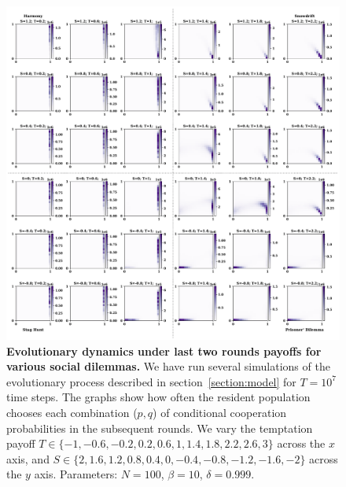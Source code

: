 \documentclass[11pt]{article}
\theoremstyle{plainCl1}
\theoremstyle{plainCl2}
\begin{document}
\begin{figure}[!htbp]
  \centering
  \includegraphics[width=\textwidth]{static/rounds_two_by_two_games.pdf}
  \caption{{\bf Evolutionary dynamics under last two rounds payoffs for various social dilemmas.} 
  We have run several simulations of the evolutionary process described in
  section~\ref{section:model} for $T\!=\!10^7$ time steps. The graphs show how
  often the resident population chooses each combination ($p,q$) of conditional
  cooperation probabilities in the subsequent rounds. We vary the temptation
  payoff \(T \in \{-1, -0.6, -0.2,  0.2, 0.6, 1, 1.4, 1.8, 2.2, 2.6, 3\}\)
  across the \(x\) axis, and  \(S \in \{2, 1.6, 1.2, 0.8, 0.4, 0, -0.4, -0.8,
  -1.2, -1.6, -2\}\) across the \(y\) axis. Parameters: $N\!=\!100$,
  $\beta\!=\!10$, $\delta\!=\!0.999$.}
  \label{fig:last_two_rounds_two_by_two}
\end{figure}
\end{document}
